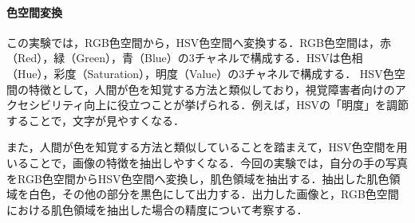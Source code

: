 \paragraph{色空間変換}この実験では，RGB色空間から，HSV色空間へ変換する．RGB色空間は，赤（Red），緑（Green），青（Blue）の3チャネルで構成する．HSVは色相（Hue），彩度（Saturation），明度（Value）の3チャネルで構成する．
HSV色空間の特徴として，人間が色を知覚する方法と類似しており，視覚障害者向けのアクセシビリティ向上に役立つことが挙げられる．例えば，HSVの「明度」を調節することで，文字が見やすくなる\cite[p.97\ -\ p.98]{画像処理}．\par
また，人間が色を知覚する方法と類似していることを踏まえて，HSV色空間を用いることで，画像の特徴を抽出しやすくなる．今回の実験では，自分の手の写真をRGB色空間からHSV色空間へ変換し，肌色領域を抽出する．抽出した肌色領域を白色，その他の部分を黒色にして出力する．出力した画像と，RGB色空間における肌色領域を抽出した場合の精度について考察する．